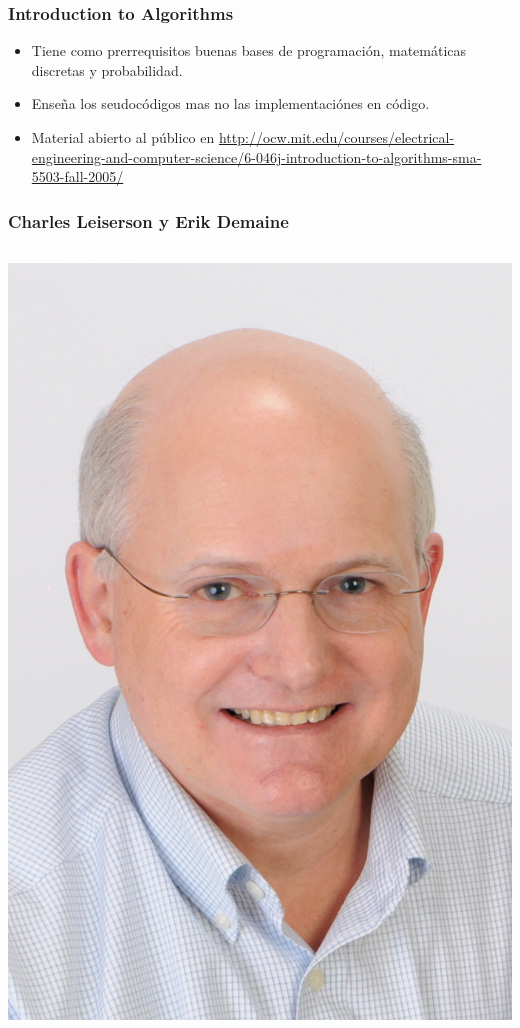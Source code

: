 \documentclass{beamer}
\begin{document}
	\begin{frame}
		\frametitle{Introduction to Algorithms}
		\begin{itemize}
			\item Tiene como prerrequisitos buenas bases de programación, matemáticas discretas y probabilidad.
			\item Enseña los seudocódigos mas no las implementaciónes en código.
			\item Material abierto al público en \url{http://ocw.mit.edu/courses/electrical-engineering-and-computer-science/6-046j-introduction-to-algorithms-sma-5503-fall-2005/}
		\end{itemize}
	\end{frame}
	
	\begin{frame}
		\frametitle{Charles Leiserson y Erik Demaine}
		\begin{columns}[l]
				\begin{center} \includegraphics[height = 0.25\textheight]{Leiserson.jpg} \end{center}

\end{columns}
\end{frame}
\end{document}

